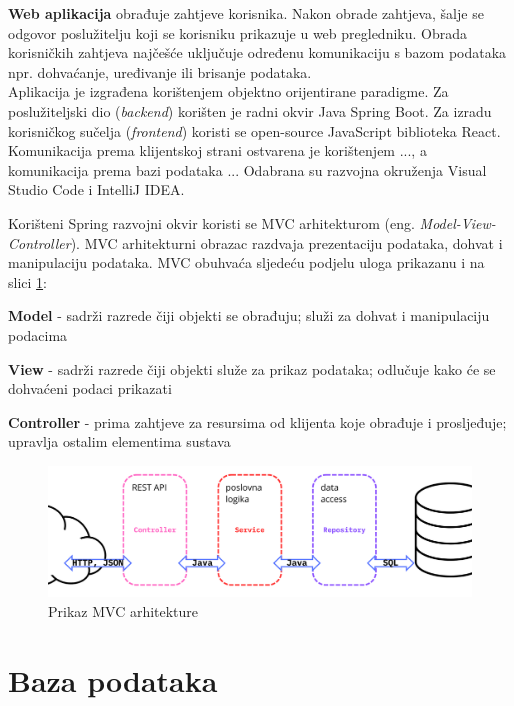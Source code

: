 		\textbf{Web aplikacija} obrađuje zahtjeve korisnika. Nakon obrade zahtjeva, šalje se odgovor poslužitelju koji se korisniku prikazuje u web pregledniku. Obrada korisničkih zahtjeva najčešće uključuje određenu komunikaciju s bazom podataka npr. dohvaćanje, uređivanje ili brisanje podataka. \\
		
				
		Aplikacija je izgrađena korištenjem objektno orijentirane paradigme. Za poslužiteljski dio (\textit{backend}) korišten je radni okvir Java Spring Boot. Za izradu korisničkog sučelja (\textit{frontend}) koristi se open-source JavaScript biblioteka React. Komunikacija prema klijentskoj strani ostvarena je korištenjem ..., a komunikacija prema bazi podataka ...
		Odabrana su razvojna okruženja Visual Studio Code i IntelliJ IDEA.
		 
		 
		\noindent Korišteni Spring razvojni okvir koristi se MVC arhitekturom (eng. \textit{Model-View-Controller}). MVC arhitekturni obrazac razdvaja prezentaciju podataka, dohvat i manipulaciju podataka. MVC obuhvaća sljedeću podjelu uloga prikazanu i na slici \ref{arh}:
		\begin{packed_item}
			\item \textbf{Model} - sadrži razrede čiji objekti se obrađuju; služi za dohvat i manipulaciju podacima
			\item \textbf{View} - sadrži razrede čiji objekti služe za prikaz podataka; odlučuje kako će se dohvaćeni podaci prikazati
			\item \textbf{Controller} - prima zahtjeve za resursima od klijenta koje
			obrađuje i prosljeđuje; upravlja ostalim elementima sustava
		\end{packed_item}
		
		
		\begin{figure}[H]
			\includegraphics[width=\textwidth]{slike/mvc-arh.PNG}
			\centering
			\caption{Prikaz MVC arhitekture}
			\label{arh}
		\end{figure}
		
		\newpage
		
		\section{Baza podataka}
			

